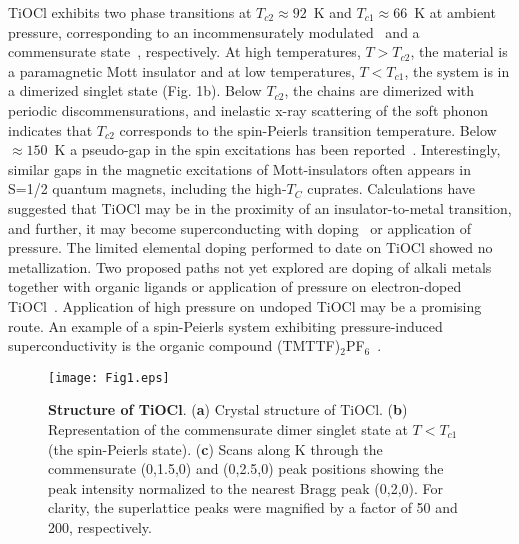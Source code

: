 \documentclass[preprint,superscriptaddress,amsmath,amssymb,aps,prl]{revtex4-1}
\begin{document}
TiOCl exhibits two phase transitions at $T_{c2}\approx92$~K and $T_{c1}\approx66$~K at ambient pressure, corresponding to an incommensurately modulated~\cite{Shaz2005,Abel2007} and a commensurate state~\cite{Ruckamp2005,Krimmel2006,Schonleber2006,Abel2007}, respectively. At high temperatures, $T>T_{c2}$, the material is a paramagnetic Mott insulator and at low temperatures, $T<T_{c1}$, the system is in a dimerized singlet state (Fig. 1b). Below $T_{c2}$, the chains are dimerized with periodic discommensurations, and inelastic x-ray scattering of the soft phonon indicates that $T_{c2}$ corresponds to the spin-Peierls transition temperature.\cite{Abel2007} Below $\approx150$~K a pseudo-gap in the spin excitations has been reported~\cite{Imai2003,Caimi2004,Lemmens2004,Hemberger2005,Clancy2007}. Interestingly, similar gaps in the magnetic excitations of Mott-insulators often appears in S=1/2 quantum magnets, including the high-$T_C$ cuprates. Calculations have suggested that TiOCl may be in the proximity of an insulator-to-metal transition, and further, it may become superconducting with doping~\cite{Beynon1993,Seidel2003,Craco2006,Kuntscher2010,Zhang2010} or application of pressure. The limited elemental doping performed to date on TiOCl showed no metallization. Two proposed paths not yet explored are doping of alkali metals together with organic ligands or application of pressure on electron-doped TiOCl~\cite{Zhang2010}. Application of high pressure on undoped TiOCl may be a promising route. An example of a spin-Peierls system exhibiting pressure-induced superconductivity is the organic compound (TMTTF)$_{2}$PF$_{6}$~\cite{Adachi2000,Jaccard2001}.

\begin{center}
\begin{figure}
\begin{center}
\texttt{[image: Fig1.eps]}
\caption{\textbf{Structure of TiOCl}. (\textbf{a}) Crystal structure of TiOCl. (\textbf{b}) Representation of the commensurate dimer singlet state at $T<T_{c1}$ (the spin-Peierls state). (\textbf{c}) Scans along K through the commensurate (0,1.5,0) and (0,2.5,0) peak positions showing the peak intensity normalized to the nearest Bragg peak (0,2,0). For clarity, the superlattice peaks were magnified by a factor of 50 and 200, respectively.}
\label{fig:Fig1}
\end{center}
\end{figure}
\end{center}
\end{document}
